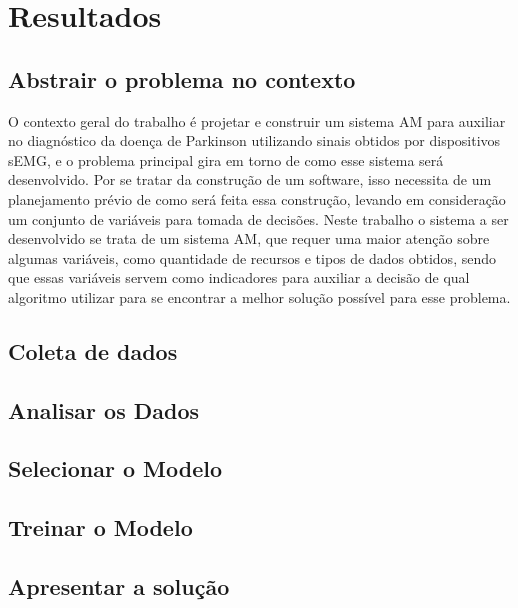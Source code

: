 \chapter*[Resultados]{Resultados}
\section{Abstrair o problema no contexto}
O contexto geral do trabalho é projetar e construir um sistema AM para auxiliar no diagnóstico da doença de Parkinson utilizando sinais obtidos por dispositivos sEMG, e o problema principal gira em torno de como esse sistema será desenvolvido. Por se tratar da construção de um software, isso necessita de um planejamento prévio de como será feita essa construção, levando em consideração um conjunto de variáveis para tomada de decisões. Neste trabalho o sistema a ser desenvolvido se trata de um sistema AM, que requer uma maior atenção sobre algumas variáveis, como quantidade de recursos e tipos de dados obtidos, sendo que essas variáveis  servem como indicadores para auxiliar a decisão de qual algoritmo utilizar para se encontrar a melhor solução possível para esse problema.

\section{Coleta de dados}
\section{Analisar os Dados}
\section{Selecionar o Modelo}
\section{Treinar o Modelo}
\section{Apresentar a solução}